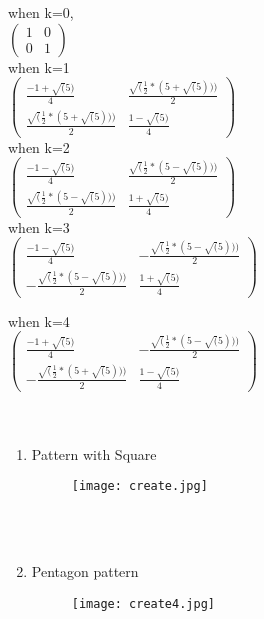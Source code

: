 \documentclass{article}
\begin{document}
when k=0,\\
$\begin{pmatrix}
1 & 0\\
0 & 1
\end{pmatrix}$\\

when k=1\\
$\begin{pmatrix}
\frac{-1+\sqrt(5)}{4} & \frac{\sqrt(\frac{1}{2}*(5+\sqrt(5)))}{2}\\
\frac{\sqrt(\frac{1}{2}*(5+\sqrt(5)))}{2}& \frac{1-\sqrt(5)}{4}
\end{pmatrix}$ \\


when k=2\\
$\begin{pmatrix}
\frac{-1-\sqrt(5)}{4} & \frac{\sqrt(\frac{1}{2}*(5-\sqrt(5)))}{2}\\
\frac{\sqrt(\frac{1}{2}*(5-\sqrt(5)))}{2}& \frac{1+\sqrt(5)}{4}
\end{pmatrix}$ \\

when k=3\\
$\begin{pmatrix}
\frac{-1-\sqrt(5)}{4} & -\frac{\sqrt(\frac{1}{2}*(5-\sqrt(5)))}{2}\\
-\frac{\sqrt(\frac{1}{2}*(5-\sqrt(5)))}{2}& \frac{1+\sqrt(5)}{4}
\end{pmatrix}$ 

when k=4\\
$\begin{pmatrix}
\frac{-1+\sqrt(5)}{4} & -\frac{\sqrt(\frac{1}{2}*(5-\sqrt(5)))}{2}\\
-\frac{\sqrt(\frac{1}{2}*(5+\sqrt(5)))}{2}& \frac{1-\sqrt(5)}{4}
\end{pmatrix}$ 
\\\\\\


\begin{enumerate}
    \item  Pattern with Square
\graphicspath{{pictures/}}
\begin{figure}[htp]
    \texttt{[image: create.jpg]}
\end{figure}\\\\

\item Pentagon pattern
\begin{figure}[htp]
    \texttt{[image: create4.jpg]}
\end{figure}
\end{enumerate}
\vspace{14cm}
\end{document}
